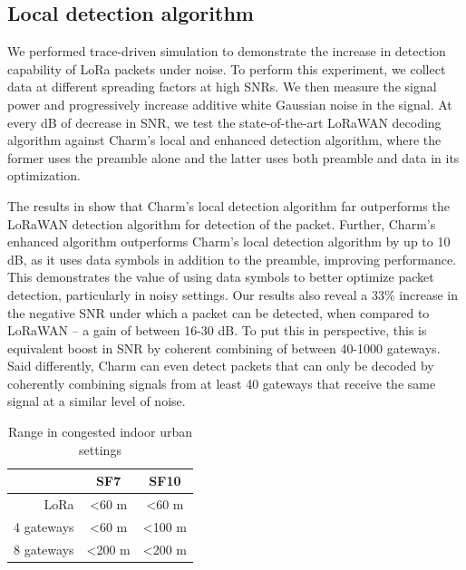 \subsection{Local detection algorithm}
\label{sec:local-detection-eval}

We performed trace-driven simulation to demonstrate the increase in detection
capability of LoRa packets under noise. To perform this experiment, we collect
data at different spreading factors at high SNRs. We then measure the signal
power and progressively increase additive white Gaussian noise in the signal.
At every dB of decrease in SNR, we test the state-of-the-art LoRaWAN decoding
algorithm against Charm's local and enhanced detection algorithm, where the
former uses the preamble alone and the latter uses both preamble and data in
its optimization.

The results in  show that Charm's local detection
algorithm far outperforms the LoRaWAN detection algorithm for detection of the
packet. Further, Charm's enhanced algorithm outperforms Charm's local
detection algorithm by up to 10 dB, as it uses data symbols in addition to the
preamble, improving performance. This demonstrates the value of using data
symbols to better optimize packet detection, particularly in noisy settings.
Our results also reveal a 33\% increase in the negative SNR under which a
packet can be detected, when compared to LoRaWAN -- a gain of between 16-30
dB. To put this in perspective, this is equivalent boost in SNR by coherent
combining of between 40-1000 gateways. Said differently, Charm can even detect
packets that can only be decoded by coherently combining signals from at least
40 gateways that receive the same signal at a similar level of noise.

\begin{table}[htb]
\centering
\begin{tabular}{r|c|c|}
\cline{2-3}
\multicolumn{1}{l|}{}            & SF7            & SF10           \\ \hline
\multicolumn{1}{|r|}{LoRa}       & \textless60 m  & \textless60 m  \\ \hline
\multicolumn{1}{|r|}{4 gateways} & \textless60 m  & \textless100 m \\ \hline
\multicolumn{1}{|r|}{8 gateways} & \textless200 m & \textless200 m \\ \hline
\end{tabular}
\caption{Range in congested indoor urban settings}
\label{tab:range}
\end{table}

